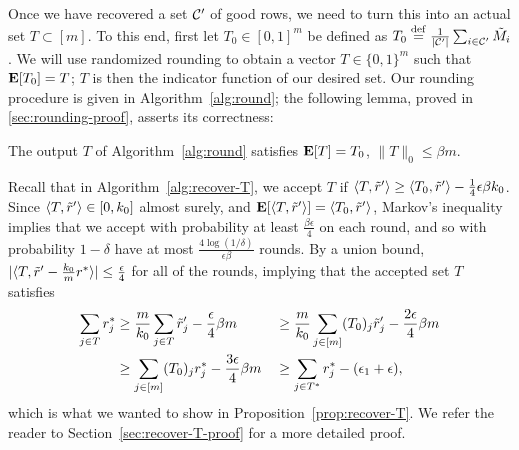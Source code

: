 Once we have recovered a set $\mathcal{C}'$ of good rows, we need to turn this 
into an actual set $T \subset [m]$. To this end, first let $T_0 \in [0,1]^m$ 
be defined as $T_0 \stackrel{\rm def}{=} \frac{1}{|\mathcal{C}'|} \sum_{i \in \mathcal{C}'} \tilde{M}_i$. 
We will use randomized rounding to obtain a vector $T \in \{0,1\}^m$ such that 
$\mathbf{E}[T_0] = T$; $T$ is then the indicator function of our desired set.
Our rounding procedure is given in Algorithm~\ref{alg:round}; the following 
lemma, proved in \ref{sec:rounding-proof}, asserts its correctness:
\begin{lemma}
\label{lem:rounding}
The output $T$ of Algorithm~\ref{alg:round} satisfies $\mathbf{E}[T] = T_0$, 
$\|T\|_0 \leq \beta m$.
\end{lemma}



Recall that in Algorithm~\ref{alg:recover-T}, we accept $T$ if 
$\langle T, \tilde{r}' \rangle \geq \langle T_0, \tilde{r}' \rangle - \frac{1}{4}\epsilon\beta k_0$. Since $\langle T, \tilde{r}' \rangle \in [0,k_0]$ almost surely, and 
$\mathbf{E}[\langle T, \tilde{r}' \rangle] = \langle T_0, \tilde{r}' \rangle$, 
Markov's inequality 
implies that we accept with probability at least $\frac{\beta \epsilon}{4}$ on 
each round, and so with probability $1-\delta$ have at most 
$\frac{4\log(1/\delta)}{\epsilon\beta}$ rounds. By a union bound, 
$|\langle T, \tilde{r}' - \frac{k_0}{m}r^* \rangle| \leq \frac{\epsilon}{4}$ 
for all of the rounds, implying that the accepted set $T$ satisfies 
\begin{alignat}{2}
\notag \sum_{j \in T} r^*_j &\geq \frac{m}{k_0}\sum_{j \in T} \tilde{r}'_j - \frac{\epsilon}{4}\beta m &&\geq \frac{m}{k_0}\sum_{j \in [m]}(T_0)_j\tilde{r}'_j  - \frac{2\epsilon}{4}\beta m \\
 &\geq \sum_{j \in [m]} (T_0)_j r^*_j - \frac{3\epsilon}{4}\beta m &&\geq \sum_{j \in T^*} r^*_j - (\epsilon_1+\epsilon),
\end{alignat}
which is what we wanted to show in Proposition~\ref{prop:recover-T}. We refer 
the reader to Section~\ref{sec:recover-T-proof} for a more detailed proof.
